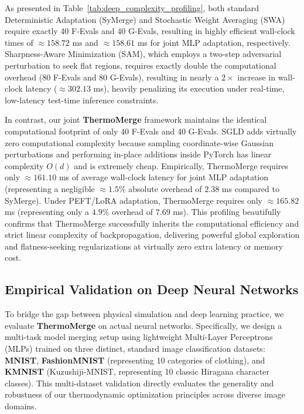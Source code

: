 As presented in Table~\ref{tab:deep_complexity_profiling}, both standard Deterministic Adaptation (SyMerge) and Stochastic Weight Averaging (SWA) require exactly 40 F-Evals and 40 G-Evals, resulting in highly efficient wall-clock times of $\approx 158.72$ ms and $\approx 158.61$ ms for joint MLP adaptation, respectively.
Sharpness-Aware Minimization (SAM), which employs a two-step adversarial perturbation to seek flat regions, requires exactly double the computational overhead (80 F-Evals and 80 G-Evals), resulting in nearly a $2\times$ increase in wall-clock latency ($\approx 302.13$ ms), heavily penalizing its execution under real-time, low-latency test-time inference constraints.

In contrast, our joint \textbf{ThermoMerge} framework maintains the identical computational footprint of only 40 F-Evals and 40 G-Evals.
SGLD adds virtually zero computational complexity because sampling coordinate-wise Gaussian perturbations and performing in-place additions inside PyTorch has linear complexity $O(d)$ and is extremely cheap.
Empirically, ThermoMerge requires only $\approx 161.10$ ms of average wall-clock latency for joint MLP adaptation (representing a negligible $\approx 1.5\%$ absolute overhead of $2.38$ ms compared to SyMerge).
Under PEFT/LoRA adaptation, ThermoMerge requires only $\approx 165.82$ ms (representing only a $4.9\%$ overhead of $7.69$ ms).
This profiling beautifully confirms that ThermoMerge successfully inherits the computational efficiency and strict linear complexity of backpropagation, delivering powerful global exploration and flatness-seeking regularizations at virtually zero extra latency or memory cost.

\subsection{Empirical Validation on Deep Neural Networks}
\label{sec:mnist_experiments}
To bridge the gap between physical simulation and deep learning practice, we evaluate \textbf{ThermoMerge} on actual neural networks.
Specifically, we design a multi-task model merging setup using lightweight Multi-Layer Perceptrons (MLPs) trained on three distinct, standard image classification datasets: \textbf{MNIST}, \textbf{FashionMNIST} (representing 10 categories of clothing), and \textbf{KMNIST} (Kuzushiji-MNIST, representing 10 classic Hiragana character classes).
This multi-dataset validation directly evaluates the generality and robustness of our thermodynamic optimization principles across diverse image domains.

